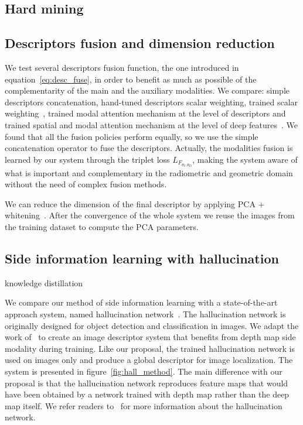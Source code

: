 \subsection{Hard mining}


\subsection{Descriptors fusion and dimension reduction}
\label{subsec:fuse_desc}
We test several descriptors fusion function, the one introduced in equation~\ref{eq:desc_fuse}, in order to benefit as much as possible of the complementarity of the main and the auxiliary modalities. We compare: simple descriptors concatenation, hand-tuned descriptors scalar weighting, trained scalar weighting~\cite{Sizikova2016}, trained modal attention mechanism at the level of descriptors and trained spatial and modal attention mechanism at the level of deep features~\cite{Seymour2018}. We found that all the fusion policies perform equally, so we use the simple concatenation operator to fuse the descriptors. Actually, the modalities fusion is learned by our system through the triplet loss $L_{F_{\theta_{I}, \theta_{D}}}$, making the system aware of what is important and complementary in the radiometric and geometric domain without the need of complex fusion methods.

We can reduce the dimension of the final descriptor by applying PCA + whitening~\cite{Arandjelovic2017, Radenovic2017, Gordo2017}. After the convergence of the whole system we reuse the images from the training dataset to compute the PCA parameters.

\subsection{Side information learning with hallucination}
\label{subsec:hall}

knowledge distillation~\citep{hinton2015distilling}

We compare our method of side information learning with a state-of-the-art approach system, named hallucination network~\cite{Hoffman2016}. The hallucination network is originally designed for object detection and classification in images. We adapt the work of~\cite{Hoffman2016} to create an image descriptor system that benefits from depth map side modality during training. Like our proposal, the trained hallucination network is used on images only and produce a global descriptor for image localization. The system is presented in figure~\ref{fig:hall_method}. The main difference with our proposal is that the hallucination network reproduces feature maps that would have been obtained by a network trained with depth map rather than the deep map itself. We refer readers to~\cite{Hoffman2016} for more information about the hallucination network.

